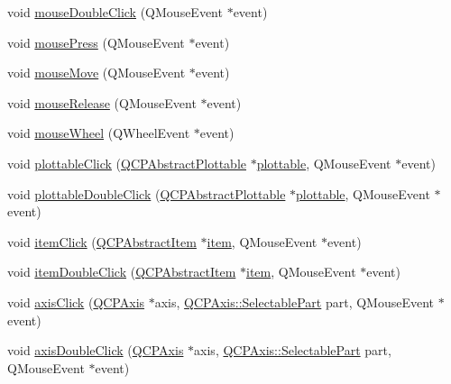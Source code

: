 \begin{DoxyCompactItemize}
\item 
void \hyperlink{classQCustomPlot_a9b232142c64fcf273a953ee08e5b90e9}{mouse\-Double\-Click} (Q\-Mouse\-Event $\ast$event)
\item 
void \hyperlink{classQCustomPlot_aca75bf9afb5dd19349c375de2a87a051}{mouse\-Press} (Q\-Mouse\-Event $\ast$event)
\item 
void \hyperlink{classQCustomPlot_a742ca4f94688bed2a685fd8a56ce5704}{mouse\-Move} (Q\-Mouse\-Event $\ast$event)
\item 
void \hyperlink{classQCustomPlot_ac8dc0ee6bb98e923c00b4ebafbe6134d}{mouse\-Release} (Q\-Mouse\-Event $\ast$event)
\item 
void \hyperlink{classQCustomPlot_ac80a14206f99304a91d2aa55775ec3ff}{mouse\-Wheel} (Q\-Wheel\-Event $\ast$event)
\item 
void \hyperlink{classQCustomPlot_a57e5efa8a854620e9bf62d31fc139f53}{plottable\-Click} (\hyperlink{classQCPAbstractPlottable}{Q\-C\-P\-Abstract\-Plottable} $\ast$\hyperlink{classQCustomPlot_a32de81ff53e263e785b83b52ecd99d6f}{plottable}, Q\-Mouse\-Event $\ast$event)
\item 
void \hyperlink{classQCustomPlot_af2e6f1cea923dae437681d01ce7d0c31}{plottable\-Double\-Click} (\hyperlink{classQCPAbstractPlottable}{Q\-C\-P\-Abstract\-Plottable} $\ast$\hyperlink{classQCustomPlot_a32de81ff53e263e785b83b52ecd99d6f}{plottable}, Q\-Mouse\-Event $\ast$event)
\item 
void \hyperlink{classQCustomPlot_ae16b51f52d2b7aebbc7e3e74e6ff2e4b}{item\-Click} (\hyperlink{classQCPAbstractItem}{Q\-C\-P\-Abstract\-Item} $\ast$\hyperlink{classQCustomPlot_a3e842b5a65b1d17fbb96cfb1fa1314d1}{item}, Q\-Mouse\-Event $\ast$event)
\item 
void \hyperlink{classQCustomPlot_ac83aa9f5a3e9bb3efc9cdc763dcd42a6}{item\-Double\-Click} (\hyperlink{classQCPAbstractItem}{Q\-C\-P\-Abstract\-Item} $\ast$\hyperlink{classQCustomPlot_a3e842b5a65b1d17fbb96cfb1fa1314d1}{item}, Q\-Mouse\-Event $\ast$event)
\item 
void \hyperlink{classQCustomPlot_abf635f8b56ab5c16d5de9f358543e82b}{axis\-Click} (\hyperlink{classQCPAxis}{Q\-C\-P\-Axis} $\ast$axis, \hyperlink{classQCPAxis_abee4c7a54c468b1385dfce2c898b115f}{Q\-C\-P\-Axis\-::\-Selectable\-Part} part, Q\-Mouse\-Event $\ast$event)
\item 
void \hyperlink{classQCustomPlot_a6df35357460181a72da3e93d600f5256}{axis\-Double\-Click} (\hyperlink{classQCPAxis}{Q\-C\-P\-Axis} $\ast$axis, \hyperlink{classQCPAxis_abee4c7a54c468b1385dfce2c898b115f}{Q\-C\-P\-Axis\-::\-Selectable\-Part} part, Q\-Mouse\-Event $\ast$event)

\end{DoxyCompactItemize}
